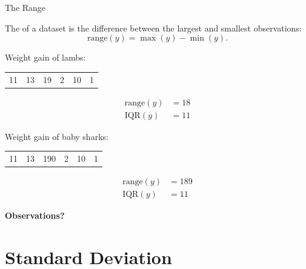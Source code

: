 \begin{frame}{The Range}

    The  of a dataset is the difference between the largest and smallest observations:
    \[
        \mathrm{range}(y) = \max(y)-\min(y) .
    \]

    \vspace{3em}
    \pause

     Weight gain of lambs:
    \begin{center}
        \begin{tabular}{cccccc}
            11 & 13 & 19 & 2 & 10 & 1
        \end{tabular}
    \end{center}
    \pause
    \begin{align*}
        \mathrm{range}(y) &= 18  \\
        \mathrm{IQR}(y) &= 11
    \end{align*}

    \pause
    \vspace{2em}

     Weight gain of baby sharks:
    \begin{center}
        \begin{tabular}{cccccc}
            11 & 13 & 190 & 2 & 10 & 1
        \end{tabular}
    \end{center}
    \pause
    \begin{align*}
        \mathrm{range}(y) &= 189 \\
        \mathrm{IQR}(y) &= 11
    \end{align*}

    \pause
    \textbf{Observations?}

\end{frame}

\section{Standard Deviation}


